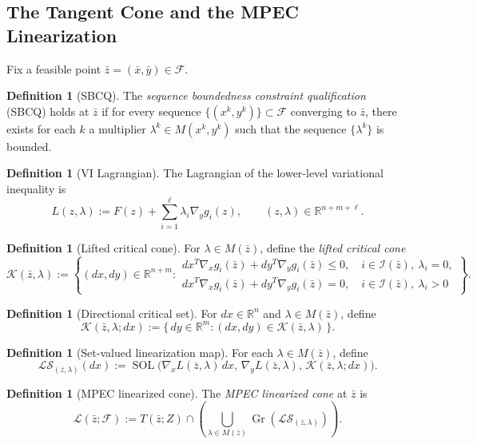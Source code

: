 \documentclass[pdflatex,sn-mathphys-num]{sn-jnl}%
\theoremstyle{definition}
\newtheorem{definition}[theorem]{Definition}
\newcommand{\R}{\mathbb{R}}
\newcommand{\Fcal}{\mathcal{F}}
\newcommand{\Lcal}{\mathcal{L}}
\newcommand{\Kcal}{\mathcal{K}}
\newcommand{\Ical}{\mathcal{I}}
\newcommand{\Gr}{\operatorname{Gr}}
\newcommand{\SOL}{\operatorname{SOL}}
\begin{document}
\subsection{The Tangent Cone and the MPEC Linearization}

Fix a feasible point $\bar z=(\bar x,\bar y)\in\Fcal$.

\begin{definition}[SBCQ]
The \emph{sequence boundedness constraint qualification} (SBCQ) holds at
$\bar z$ if for every sequence $\{(x^k,y^k)\}\subset \Fcal$ converging to
$\bar z$, there exists for each $k$ a multiplier $\lambda^k\in M(x^k,y^k)$
such that the sequence $\{\lambda^k\}$ is bounded.
\end{definition}

\begin{definition}[VI Lagrangian]
The Lagrangian of the lower-level variational inequality is
\[
L(z,\lambda):=F(z)+\sum_{i=1}^{\ell}\lambda_i\nabla_y g_i(z),
\qquad (z,\lambda)\in \R^{n+m+\ell}.
\]
\end{definition}

\begin{definition}[Lifted critical cone]
For $\lambda\in M(\bar z)$, define the \emph{lifted critical cone}
\[
\Kcal(\bar z,\lambda):=
\left\{
(dx,dy)\in\R^{n+m}:
\begin{array}{l}
dx^T\nabla_x g_i(\bar z)+dy^T\nabla_y g_i(\bar z)\le 0,
\quad i\in\Ical(\bar z),\ \lambda_i=0,\\[0.3em]
dx^T\nabla_x g_i(\bar z)+dy^T\nabla_y g_i(\bar z)=0,
\quad i\in\Ical(\bar z),\ \lambda_i>0
\end{array}
\right\}.
\]
\end{definition}

\begin{definition}[Directional critical set]
For $dx\in\R^n$ and $\lambda\in M(\bar z)$, define
\[
\Kcal(\bar z,\lambda;dx):=
\{\,dy\in\R^m:(dx,dy)\in \Kcal(\bar z,\lambda)\,\}.
\]
\end{definition}

\begin{definition}[Set-valued linearization map]
For each $\lambda\in M(\bar z)$, define
\[
\mathscr{L}\mathscr{S}_{(\bar z,\lambda)}(dx):=
\SOL\bigl(\nabla_xL(\bar z,\lambda)\,dx,\,
          \nabla_yL(\bar z,\lambda),\,
          \Kcal(\bar z,\lambda;dx)\bigr).
\]
\end{definition}

\begin{definition}[MPEC linearized cone]
The \emph{MPEC linearized cone} at $\bar z$ is
\[
\Lcal(\bar z;\Fcal):=
T(\bar z;Z)\cap
\left(
\bigcup_{\lambda\in M(\bar z)}
\Gr(\mathscr{L}\mathscr{S}_{(\bar z,\lambda)})
\right).
\]
\end{definition}
\end{document}
